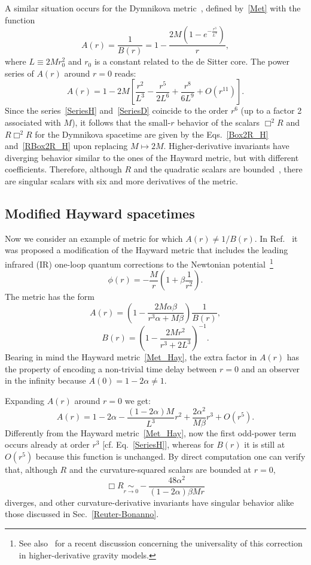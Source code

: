 \documentclass[aps,prd,a4paper,twocolumn,showpacs,showkeys,preprintnumbers,amsmath,amssymb,nofootinbib,usenames,dvipsnames]{revtex4-2}
\newcommand{\be}{\begin{eqnarray}}
\def\beq{\begin{equation}}
\def\eeq{\end{equation}}
\def\al{\alpha}
\def\be{\beta}
\begin{document}
A similar situation occurs for the Dymnikova metric~\cite{Dymnikova:1992ux}, defined by~\eqref{Met} with the function
\beq
A (r) = \frac{1}{B(r)} = 1 - \frac{2 M ( 
1 - e^{ - \frac{r^3}{L^3} } 
)}{r}
,
\eeq
where $L \equiv 2M r_0^2$ and $r_0$ is a constant related to the de Sitter core. The power series of $A(r)$ around $r=0$ reads: 
\beq \label{SeriesD}
A(r) = 
1 - 2 M \left[ \frac{r^2}{L^3} - \frac{r^5}{2 L^6 } +  \frac{r^8}{6 L^9 }
+O(r^{11}) \right] 
.
\eeq
Since the series~\eqref{SeriesH} and~\eqref{SeriesD} coincide to the order $r^6$ (up to a factor 2 associated with $M$), it follows that the small-$r$ behavior of the scalars $\Box^2 R$ and $R \Box^2 R$ for the Dymnikova spacetime are given by the Eqs.~\eqref{Box2R_H} and~\eqref{RBox2R_H} upon replacing $M \mapsto 2M$. Higher-derivative invariants have diverging behavior similar to the ones of the Hayward metric, but with different coefficients.
Therefore, although $R$
and the quadratic scalars are bounded~\cite{Dymnikova:1992ux}, there are singular scalars with six and more derivatives of the metric.


\subsection{Modified Hayward spacetimes}

Now we consider an example of metric for which $A (r) \neq 1/B(r)$.
In Ref.~\cite{DeLorenzo:2014pta} it was proposed a modification of the Hayward metric that includes the leading infrared (IR) one-loop quantum corrections to the Newtonian potential~\cite{Duff:1974ud,Donoghue:1993&94}\footnote{See also~\cite{Nos4der,Nos6der} for a recent discussion concerning the universality of this correction in higher-derivative gravity models.}
\beq
\phi (r) = - \frac{M}{r} \left( 1 + \beta \frac{1}{r^2} \right).
\eeq
The metric has the form
%
\beq \label{MetModHay}
A(r) = \left( 1 -  \frac{ 2 M \al \be }{r^3 \al + M \be} \right) \frac{1}{B(r)} ,
\eeq
%
\beq
B(r) =  \left(1 - \frac{ 2  M  r^2}{r^3 + 2L^3} \right)^{-1} .
\eeq
Bearing in mind the Hayward metric~\eqref{Met_Hay}, the extra factor in $A(r)$ has the property of encoding a non-trivial time delay between $r=0$ and an observer in the infinity because $A(0) = 1 - 2 \al \neq 1$.

Expanding $A(r)$ around $r=0$ we get:
%
\beq \label{SeriesHMod}
A(r) = 
1 - 2 \al - \frac{(1-2\al)M}{L^3} r^2 + \frac{2\al^2}{ M \be} r^3 + O(r^5)
.
\eeq
Differently from the Hayward metric~\eqref{Met_Hay}, now the first odd-power term occurs already at order $r^3$ [{cf.} Eq.~\eqref{SeriesH}], whereas for $B(r)$ it is still at $O(r^5)$ because this function is unchanged. By direct computation one can verify that, although $R$ and the curvature-squared scalars are bounded at $r=0$, 
\beq \label{BR-Hmod}
\Box R \underset{r \to 0}{\sim} - \frac{48 \al^2}{(1 - 2\al) \be M r} 
\eeq
diverges, and other curvature-derivative invariants have singular behavior alike those discussed in Sec.~\ref{Reuter-Bonanno}.
\end{document}
